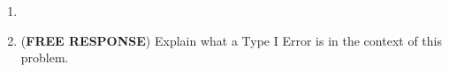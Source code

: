 \begin{enumerate}
\begin{enumerate}
\item Identify the appropriate decision. 
\begin{itemize}
\item Since the $p$-value is less than $\alpha$ = 0.01, we reject the null hypothesis.
\item Since the $p$-value is greater than $\alpha$ = 0.01, we reject the null hypothesis.
\item Since the $p$-value is less than $\alpha$ = 0.01, we fail to reject the null hypothesis.
\item Since the $p$-value is greater than $\alpha$ = 0.01, we fail to reject the null hypothesis.
\end{itemize}
\item[]
\item (\textbf{FREE RESPONSE}) Based on your decision, write a conclusion in the context of the problem.
\end{enumerate}
\item[]
\item (\textbf{FREE RESPONSE}) Explain what a Type I Error is in the context of this problem.

\end{enumerate}